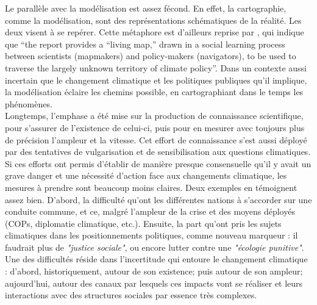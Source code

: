 Le parallèle avec la modélisation est assez fécond. En effet, la cartographie, comme la modélisation, sont des représentations schématiques de la réalité. Les deux visent à se repérer. Cette métaphore est d'ailleurs reprise par \autocite{edenhofer_mapmakers_2014}, qui indique que \enquote{the report provides a “living map,” drawn in a social learning process between scientists (mapmakers) and policy-makers (navigators), to be used to traverse the largely unknown territory of climate policy}. Dans un contexte aussi incertain que le changement climatique et les politiques publiques qu'il implique, la modélisation éclaire les chemins possible, en cartographiant dans le temps les phénomènes. \\

Longtemps, l'emphase a été mise sur la production de connaissance scientifique, pour s'assurer de l'existence de celui-ci, puis pour en mesurer avec toujours plus de précision l'ampleur et la vitesse. Cet effort de connaissance s'est aussi déployé par des tentatives de vulgarisation et de sensibilisation aux questions climatiques. Si ces efforts ont permis d'établir de manière presque consensuelle qu'il y avait un grave danger et une nécessité d'action face aux changements climatique, les mesures à prendre sont beaucoup moins claires. Deux exemples en témoignent assez bien. D'abord, la difficulté qu'ont les différentes nations à s'accorder sur une conduite commune, et ce, malgré l'ampleur de la crise et des moyens déployés (COPs, diplomatie climatique, etc.). Ensuite, la part qu'ont pris les sujets climatiques dans les positionnements politiques, comme nouveau marqueur : il faudrait plus de \textit{"justice sociale"}, ou encore lutter contre une \textit{"écologie punitive"}. \\

Une des difficultés réside dans l'incertitude qui entoure le changement climatique : d'abord, historiquement, autour de son existence; puis autour de son ampleur; aujourd'hui, autour des canaux par lesquels ces impacts vont se réaliser et leurs interactions avec des structures sociales par essence très complexes. 

